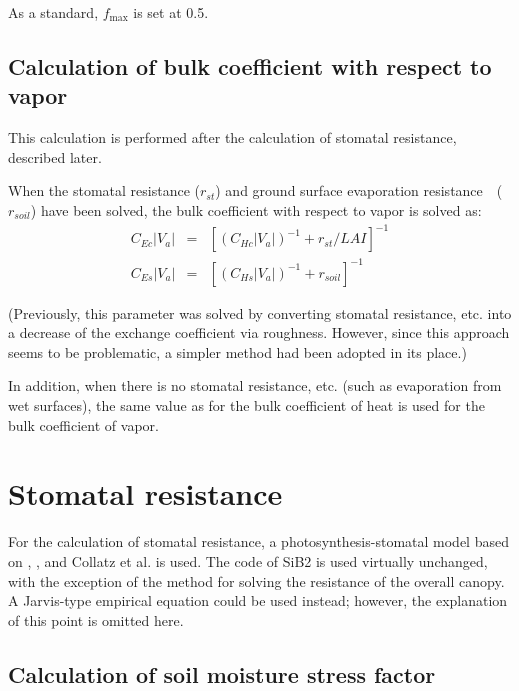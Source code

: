 As a standard, \(f_{\max}\) is set at 0.5.

\subsection{Calculation of bulk coefficient with respect to vapor}\label{calculation-of-bulk-coefficient-with-respect-to-vapor}

This calculation is performed after the calculation of stomatal resistance, described later.

When the stomatal resistance (\(r_{st}\)) and ground surface evaporation resistance　(\(r_{soil}\)) have been solved, the bulk coefficient with respect to vapor is solved as: \begin{eqnarray}
 C_{Ec} |V_a| &=& \left[ (C_{Hc} |V_a|)^{-1} + r_{st} / LAI\right]^{-1} \\
 C_{Es} |V_a| &=& \left[ (C_{Hs} |V_a|)^{-1} + r_{soil}\right]^{-1}
\end{eqnarray}

(Previously, this parameter was solved by converting stomatal resistance, etc. into a decrease of the exchange coefficient via roughness. However, since this approach seems to be problematic, a
simpler method had been adopted in its place.)

In addition, when there is no stomatal resistance, etc. (such as evaporation from wet surfaces), the same value as for the bulk coefficient of heat is used for the bulk coefficient of vapor.

\section{Stomatal resistance}\label{stomatal-resistance}

For the calculation of stomatal resistance, a photosynthesis-stomatal model based on \citet{Farquhar1980-dm}, \citet{Ball1988-jh}, and Collatz et al.
\citetext{\citeyear{Collatz1990-pw}; \citeyear{Collatz1991-lz}; \citeyear{Collatz1992-hc}} is used. The code of SiB2 \citep{Sellers1996-xi} is used virtually unchanged, with the exception of the
method for solving the resistance of the overall canopy. A Jarvis-type empirical equation could be used instead; however, the explanation of this point is omitted here.

\subsection{Calculation of soil moisture stress factor}\label{calculation-of-soil-moisture-stress-factor}

